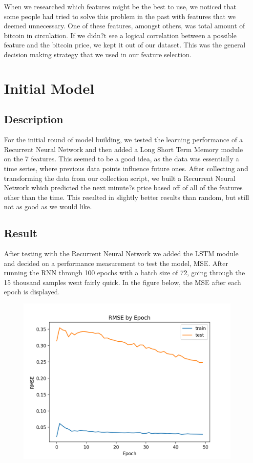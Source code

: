 \documentclass{article}
\begin{document}
When we researched which features might be the best to use, we noticed that some people had tried to solve this problem in the past with features that we deemed unnecessary. One of these features, amongst others, was total amount of bitcoin in circulation. If we didn?t see a logical correlation between a possible feature and the bitcoin price, we kept it out of our dataset. This was the general decision making strategy that we used in our feature selection. \\


\section{ Initial Model }

\subsection{ Description }
For the initial round of model building, we tested the learning performance of a Recurrent Neural Network and then added a Long Short Term Memory module on the 7 features. This seemed to be a good idea, as the data was essentially a time series, where previous data points influence future ones. After collecting and transforming the data from our collection script, we built a Recurrent Neural Network which predicted the next minute?s price based off of all of the features other than the time.  This resulted in slightly better results than random, but still not as good as we would like. \\

\subsection{ Result }
After testing with the Recurrent Neural Network we added the LSTM module and decided on a performance measurement to test the model, MSE.  After running the RNN through 100 epochs with a batch size of 72, going through the 15 thousand samples went fairly quick.  In the figure below,  the MSE after each epoch is displayed. \\

\begin{figure}[htbp]
	\includegraphics[scale=0.60 ]{../pic/rnn.png}
\end{figure}
\end{document}
